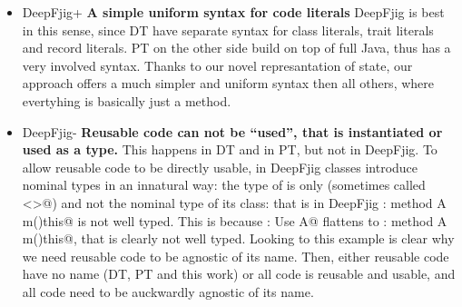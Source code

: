 \begin{itemize}
\item DeepFjig+ {\bf A simple uniform syntax for code literals}
DeepFjig is best in this sense, since DT have separate syntax for class literals, trait literals and record literals.
PT on the other side build on top of full Java, thus has a very involved syntax.
Thanks to our novel represantation of state, our approach offers a much simpler and uniform syntax then
all others, where evertyhing is basically just a method.
\item DeepFjig-
{\bf Reusable code can not be ``used'', that is instantiated or used as a type.}
This happens in DT and in PT, but not in DeepFjig. To allow reusable code to be directly 
usable, in DeepFjig
classes introduce nominal types in an innatural way: the type of \Q@this@ is only \Q@This@ (sometimes called \Q@<>@) and not the nominal type of its class: that is in DeepFjig 
\Q@A:{ method A m()this}@ is not well typed. This is because
\Q@B: Use A@ flattens to \Q@B:{ method A m()this}@, that is clearly not well typed.
Looking to this example is clear why we need reusable code to be agnostic of its name.
Then, either reusable code have no name (DT, PT and this work)
or all code is reusable and usable, and all code need to be auckwardly agnostic of its name.


\end{itemize}
